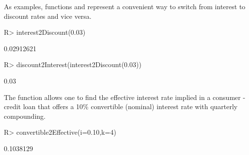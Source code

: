 \documentclass[nojss]{jss}
\begin{document}
As examples, functions  and
 represent a convenient way to switch from
interest to discount rates and vice versa.



\begin{Schunk}
\begin{Sinput}
R> interest2Discount(0.03)
\end{Sinput}
\begin{Soutput}
[1] 0.02912621
\end{Soutput}
\begin{Sinput}
R> discount2Interest(interest2Discount(0.03))
\end{Sinput}
\begin{Soutput}
[1] 0.03
\end{Soutput}
\end{Schunk}

The function  allows one to find the
effective interest rate implied in a consumer - credit loan that offers a 10\%
convertible (nominal) interest rate with quarterly compounding.

\begin{Schunk}
\begin{Sinput}
R> convertible2Effective(i=0.10,k=4)
\end{Sinput}
\begin{Soutput}
[1] 0.1038129
\end{Soutput}
\end{Schunk}
\end{document}
